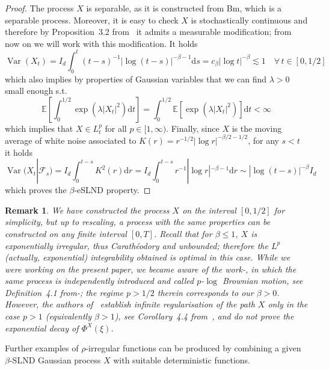 \documentclass[10pt]{article}
\newcommand{\mathd}{\mathrm{d}}
\newcommand{\nobracket}{}
\newcommand{\tmop}[1]{\ensuremath{\operatorname{#1}}}
\newtheorem{remark}[theorem]{Remark}
\begin{document}
\begin{proof}
  The process $X$ is separable, as it is constructed from Bm, which is a
  separable process. Moreover, it is easy to check $X$ is stochastically
  continuous and therefore by Proposition~3.2 from~{\cite{daprato}} it admits
  a measurable modification; from now on we will work with this modification.
  It holds
  \[ \tmop{Var} (X_t) = I_d  \int_0^t (t - s)^{- 1} | \log (t - s) |^{- \beta
     - 1} \mathd s = c_{\beta}  | \log t |^{- \beta} \lesssim 1 \quad \forall
     \, t \in [0, 1 / 2] \]
  which also implies by properties of Gaussian variables that we can find
  $\lambda > 0$ small enough s.t.
  \[ \mathbb{E} \left[ \int_0^{1 / 2} \exp (\lambda | X_t |^2) \mathd t
     \right] = \int_0^{1 / 2} \mathbb{E} [\exp (\lambda | X_t |^2)] \mathd t <
     \infty \]
  which implies that $X \in L^p_t$ for all $p \in [1, \infty)$. Finally, since
  $X$ is the moving average of white noise associated to $K (r) = r^{- 1 / 2} 
  | \log r |^{- \beta / 2 - 1 / 2}$, for any $s < t$ it holds
  \[ \tmop{Var} (X_t | \mathcal{F}_s \nobracket) = I_d \int_0^{t - s} K^2 (r)
     \mathd r = I_d \int_0^{t - s} r^{- 1} | \log r |^{- \beta - 1} \mathd r
     \sim | \log (t - s) |^{- \beta} I_d \]
  which proves the $\beta$\mbox{-}eSLND property.
\end{proof}

\begin{remark}
  We have constructed the process $X$ on the interval $[0, 1 / 2]$ for
  simplicity, but up to rescaling, a process with the same properties can be
  constructed on any finite interval $[0, T]$. Recall that for $\beta
  \leqslant 1$, $X$ is exponentially irregular, thus Carath{\'e}odory and
  unbounded; therefore the $L^p$ (actually, exponential) integrability
  obtained is optimal in this case. While we were working on the present
  paper, we became aware of the work\mbox{-}{\cite{perkowski}}, in which the
  same process is independently introduced and called $p$\mbox{-}$\log$
  Brownian motion, see Definition~4.1 from\mbox{-}{\cite{perkowski}}; the
  regime $p > 1 / 2$ therein corresponds to our $\beta > 0$. However, the
  authors of~{\cite{perkowski}} establish infinite regularisation of the path
  $X$ only in the case $p > 1$ (equivalently $\beta > 1$), see Corollary~4.4
  from~{\cite{perkowski}}, and do not prove the exponential decay of $\Phi^X
  (\xi)$.
\end{remark}

Further examples of $\rho$-irregular functions can be produced by combining a
given $\beta$\mbox{-}SLND Gaussian process $X$ with suitable deterministic
functions.
\end{document}
